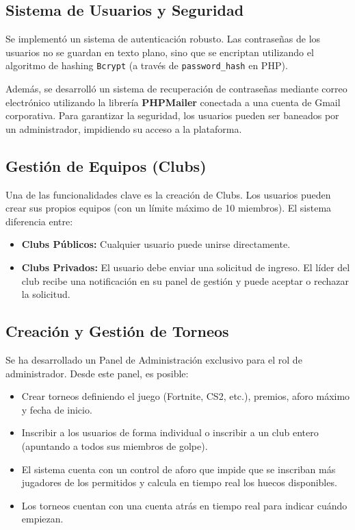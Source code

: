 \documentclass{article}
\begin{document}
\subsection{Sistema de Usuarios y Seguridad}
Se implementó un sistema de autenticación robusto. Las contraseñas de los usuarios no se guardan en texto plano, sino que se encriptan utilizando el algoritmo de hashing \texttt{Bcrypt} (a través de \texttt{password\_hash} en PHP). 

Además, se desarrolló un sistema de recuperación de contraseñas mediante correo electrónico utilizando la librería \textbf{PHPMailer} conectada a una cuenta de Gmail corporativa. Para garantizar la seguridad, los usuarios pueden ser baneados por un administrador, impidiendo su acceso a la plataforma.

\subsection{Gestión de Equipos (Clubs)}
Una de las funcionalidades clave es la creación de Clubs. Los usuarios pueden crear sus propios equipos (con un límite máximo de 10 miembros). El sistema diferencia entre:
\begin{itemize}
    \item \textbf{Clubs Públicos:} Cualquier usuario puede unirse directamente.
    \item \textbf{Clubs Privados:} El usuario debe enviar una solicitud de ingreso. El líder del club recibe una notificación en su panel de gestión y puede aceptar o rechazar la solicitud.
\end{itemize}

\subsection{Creación y Gestión de Torneos}
Se ha desarrollado un Panel de Administración exclusivo para el rol de administrador. Desde este panel, es posible:
\begin{itemize}
    \item Crear torneos definiendo el juego (Fortnite, CS2, etc.), premios, aforo máximo y fecha de inicio.
    \item Inscribir a los usuarios de forma individual o inscribir a un club entero (apuntando a todos sus miembros de golpe).
    \item El sistema cuenta con un control de aforo que impide que se inscriban más jugadores de los permitidos y calcula en tiempo real los huecos disponibles.
    \item Los torneos cuentan con una cuenta atrás en tiempo real para indicar cuándo empiezan.
\end{itemize}
\end{document}
